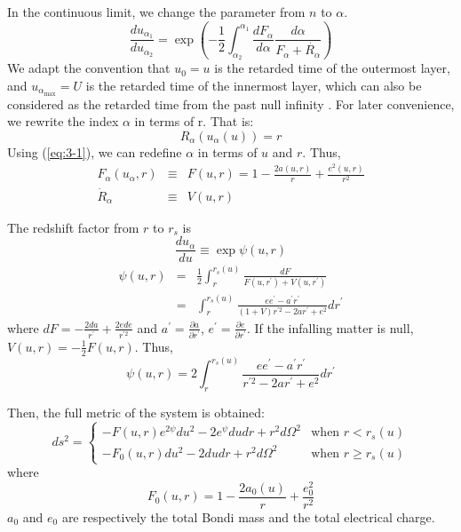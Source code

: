 \documentclass[letterpaper,12pt]{article}
\begin{document}
In the continuous limit, we change the parameter from $n$ to $\alpha$.
\begin{equation}\label{eq:3-4}
\frac{du_{\alpha_{1}}}{du_{\alpha_{2}}} = \exp\left(-\frac{1}{2}\int_{\alpha_{2}}^{\alpha_{1}}
\frac{dF_{\alpha}}{d\alpha}\frac{d\alpha}{F_{\alpha}+\dot{R_{\alpha}}}\right)
\end{equation}
We adapt the convention that $u_{0} = u$ is the retarded time of the outermost layer, and $u_{\alpha_{\textrm{max}}} =U$ is the retarded time of the innermost layer, which can also be considered as the retarded time from the past null infinity \cite{ho2016asymptotic}. For later convenience, we rewrite the index $\alpha$ in terms of r. That is:
\begin{equation}\label{eq:3-1}
R_{\alpha}(u_{\alpha}(u)) = r
\end{equation}
Using (\ref{eq:3-1}), we can redefine $\alpha$ in terms of $u$ and $r$. Thus,
\begin{eqnarray}
  F_{\alpha}(u_{\alpha}, r) &\equiv& F(u, r) = 1-\frac{2a(u,r)}{r}+\frac{e^{2}(u,r)}{r^2}\\
  \dot{R}_{\alpha} &\equiv& V(u,r)
\end{eqnarray}

The redshift factor from $r$ to $r_{s}$ is
\begin{equation}\label{eq:3-2}
\frac{du_{\alpha}}{du}  \equiv \exp \psi(u,r)
\end{equation}
\begin{eqnarray}
  \psi(u,r) &=& \frac{1}{2}\int^{r_{s}(u)}_{r}\frac{dF}{F(u, r^{\prime})+V(u, r^{\prime})} \\
   &=&\int^{r_{s}(u)}_{r}\frac{ee^{\prime}-a^{\prime}r^{\prime}}{(1+V)r^{\prime 2}-2ar^{\prime}+e^2}dr^{\prime}\label{eq:3-11} \end{eqnarray}\label{eq:3-3}
where $dF = -\frac{2da}{r^{\prime}}+\frac{2ede}{r^{\prime 2}}$ and $a^{\prime} = \frac{\partial a}{\partial r^{\prime}}$, $e^{\prime} = \frac{\partial e}{\partial r^{\prime}}$. 
If the infalling matter is null, $V(u,r)= -\frac{1}{2}F(u,r)$. Thus,
\begin{equation} \label{eq:3-13}
\psi(u, r)=2\int^{r_{s}(u)}_{r}\frac{ee^{\prime}-a^{\prime}r^{\prime}}{r^{\prime 2}-2ar^{\prime}+e^2}dr^{\prime}
\end{equation}

Then, the full metric of the system is obtained:
\begin{equation}\label{eq:3-7}
ds^2 =\begin{cases}
   -F(u,r)e^{2\psi}du^{2}-2e^{\psi}dudr+r^{2}d\Omega^{2} & \mbox{when } r < r_{s}(u) \\
  -F_{0}(u,r)du^2 -2dudr + r^{2}d\Omega^{2}  & \mbox{when } r \geq r_{s}(u)
\end{cases}
\end{equation}
where
\begin{equation}
F_{0}(u,r) = 1-\frac{2a_{0}(u)}{r}+\frac{e_{0}^2}{r^{2}}
\end{equation}
$a_{0}$ and $e_{0}$ are respectively the total Bondi mass and the total electrical charge.
\end{document}
